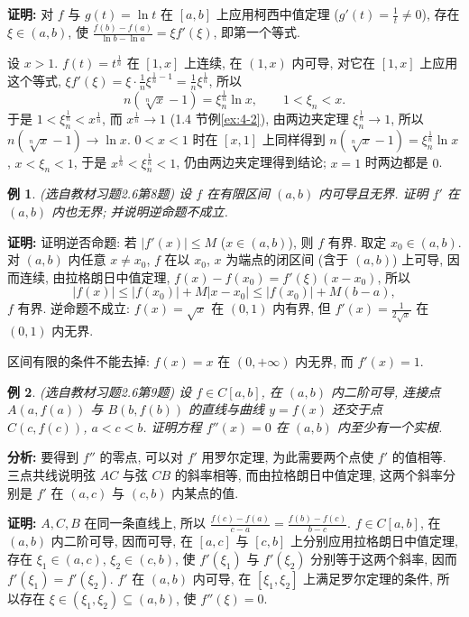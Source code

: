\documentclass[UTF8,openany]{ctexbook}
\theoremstyle{chinesetextbook}
\newtheorem{example}{例}[section]
\newenvironment{cnproof}{\par\indent\textbf{证明:} \ignorespaces}{\par}
\begin{document}
\begin{cnproof}
对 $f$ 与 $g(t)=\ln t$ 在 $[a,b]$ 上应用柯西中值定理 ($\displaystyle g'(t)=\frac1t\ne0$), 存在 $\xi\in(a,b)$, 使 $\displaystyle\frac{f(b)-f(a)}{\ln b-\ln a}=\xi f'(\xi)$, 即第一个等式.

设 $x>1$. $f(t)=t^{\frac1n}$ 在 $[1,x]$ 上连续, 在 $(1,x)$ 内可导, 对它在 $[1,x]$ 上应用这个等式, $\displaystyle\xi f'(\xi)=\xi\cdot\frac1n\xi^{\frac1n-1}=\frac1n\xi^{\frac1n}$, 所以
\[
n\left(\sqrt[n]x-1\right)=\xi_n^{\frac1n}\ln x,\qquad1<\xi_n<x.
\]
于是 $1<\xi_n^{\frac1n}<x^{\frac1n}$, 而 $x^{\frac1n}\to1$ (1.4 节例\ref{ex:4-2}), 由两边夹定理 $\xi_n^{\frac1n}\to1$, 所以 $n\left(\sqrt[n]x-1\right)\to\ln x$. $0<x<1$ 时在 $[x,1]$ 上同样得到 $n\left(\sqrt[n]x-1\right)=\xi_n^{\frac1n}\ln x$, $x<\xi_n<1$, 于是 $x^{\frac1n}<\xi_n^{\frac1n}<1$, 仍由两边夹定理得到结论; $x=1$ 时两边都是 $0$.
\end{cnproof}
\begin{example}\label{ex:c2-h6-8}
\textnormal{(选自教材习题2.6第8题)} 设 $f$ 在有限区间 $(a,b)$ 内可导且无界. 证明 $f'$ 在 $(a,b)$ 内也无界; 并说明逆命题不成立.
\end{example}
\begin{cnproof}
证明逆否命题: 若 $|f'(x)|\le M$ ($x\in(a,b)$), 则 $f$ 有界. 取定 $x_0\in(a,b)$. 对 $(a,b)$ 内任意 $x\ne x_0$, $f$ 在以 $x_0$, $x$ 为端点的闭区间 (含于 $(a,b)$) 上可导, 因而连续, 由拉格朗日中值定理, $f(x)-f(x_0)=f'(\xi)(x-x_0)$, 所以
\[
|f(x)|\le|f(x_0)|+M|x-x_0|\le|f(x_0)|+M(b-a),
\]
$f$ 有界. 逆命题不成立: $f(x)=\sqrt x$ 在 $(0,1)$ 内有界, 但 $\displaystyle f'(x)=\frac1{2\sqrt x}$ 在 $(0,1)$ 内无界.
\end{cnproof}
区间有限的条件不能去掉: $f(x)=x$ 在 $(0,+\infty)$ 内无界, 而 $f'(x)=1$.
\begin{example}\label{ex:c2-h6-9}
\textnormal{(选自教材习题2.6第9题)} 设 $f\in C[a,b]$, 在 $(a,b)$ 内二阶可导, 连接点 $A(a,f(a))$ 与 $B(b,f(b))$ 的直线与曲线 $y=f(x)$ 还交于点 $C(c,f(c))$, $a<c<b$. 证明方程 $f''(x)=0$ 在 $(a,b)$ 内至少有一个实根.
\end{example}
\par\indent\textbf{分析:} 要得到 $f''$ 的零点, 可以对 $f'$ 用罗尔定理, 为此需要两个点使 $f'$ 的值相等. 三点共线说明弦 $AC$ 与弦 $CB$ 的斜率相等, 而由拉格朗日中值定理, 这两个斜率分别是 $f'$ 在 $(a,c)$ 与 $(c,b)$ 内某点的值.
\begin{cnproof}
$A,C,B$ 在同一条直线上, 所以 $\displaystyle\frac{f(c)-f(a)}{c-a}=\frac{f(b)-f(c)}{b-c}$. $f\in C[a,b]$, 在 $(a,b)$ 内二阶可导, 因而可导, 在 $[a,c]$ 与 $[c,b]$ 上分别应用拉格朗日中值定理, 存在 $\xi_1\in(a,c)$, $\xi_2\in(c,b)$, 使 $f'(\xi_1)$ 与 $f'(\xi_2)$ 分别等于这两个斜率, 因而 $f'(\xi_1)=f'(\xi_2)$. $f'$ 在 $(a,b)$ 内可导, 在 $[\xi_1,\xi_2]$ 上满足罗尔定理的条件, 所以存在 $\xi\in(\xi_1,\xi_2)\subseteq(a,b)$, 使 $f''(\xi)=0$.
\end{cnproof}
\end{document}
